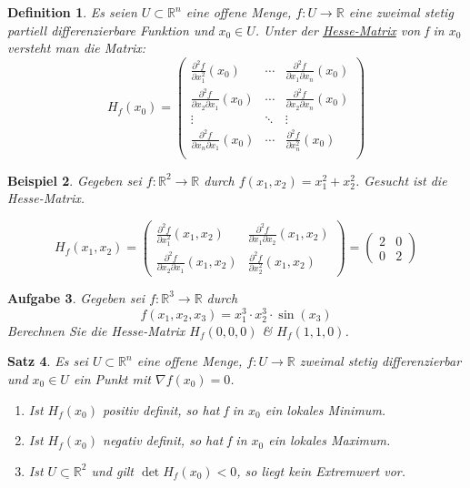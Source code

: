 \documentclass[fontset=ubuntu,12pt,a4paper]{scrreprt}
\newtheorem{defi}{Definition}[section]
\newtheorem{beispiel}[defi]{Beispiel}
\newtheorem{satz}[defi]{Satz}
\newtheorem{aufg}[defi]{Aufgabe}
\begin{document}
\begin{defi}
    Es seien \(U\subset\mathbb{R}^n\) eine offene Menge, \(f:U\to\mathbb{R}\) eine zweimal stetig partiell differenzierbare Funktion und \(x_0\in U\). Unter der \underline{Hesse-Matrix} von f in \(x_0\) versteht man die Matrix: \[H_f(x_0)=\begin{pmatrix}
    \frac{\partial^2 f}{\partial x_1^2}(x_0) & \cdots & \frac{\partial^2 f}{\partial x_1 \partial x_n}(x_0) \\
    \frac{\partial^2 f}{\partial x_2 \partial x_1}(x_0) & \cdots & \frac{\partial^2 f}{\partial x_2 \partial x_n}(x_0) \\
    \vdots & \ddots & \vdots \\
    \frac{\partial^2 f}{\partial x_n \partial x_1}(x_0) & \cdots & \frac{\partial^2 f}{\partial x_n^2}(x_0) \\
    \end{pmatrix}\]
\end{defi}

\begin{beispiel}
    Gegeben sei \(f:\mathbb{R}^2\to\mathbb{R}\) durch \(f(x_1,x_2)=x_1^2+x_2^2\). Gesucht ist die Hesse-Matrix.
    
    \[H_f(x_1,x_2)=\begin{pmatrix}
    \frac{\partial^2 f}{\partial x_1^2}(x_1,x_2)  & \frac{\partial^2 f}{\partial x_1 \partial x_2}(x_1,x_2) \\
    \frac{\partial^2 f}{\partial x_2 \partial x_1}(x_1,x_2) & \frac{\partial^2 f}{\partial x_2^2}(x_1,x_2)
    \end{pmatrix}=\begin{pmatrix}
    2 & 0 \\ 0 & 2
    \end{pmatrix}\]
\end{beispiel}

\begin{aufg}
    Gegeben sei \(f:\mathbb{R}^3\to\mathbb{R}\) durch
    \[f(x_1,x_2,x_3)=x_1^3 \cdot x_2^3 \cdot \sin(x_3)\]
    Berechnen Sie die Hesse-Matrix \(H_f(0,0,0)\) \& \(H_f(1,1,0)\).
\end{aufg}

\begin{satz}
    Es sei \(U\subset\mathbb{R}^n\) eine offene Menge, \(f:U\to\mathbb{R}\) zweimal stetig differenzierbar und \(x_0\in U\) ein Punkt mit \(\nabla f(x_0)=0\).
    \begin{enumerate}[label=\emph{(\roman*)}]
        \item Ist \(H_f(x_0)\) positiv definit, so hat f in \(x_0\) ein lokales Minimum.
        \item Ist \(H_f(x_0)\) negativ definit, so hat f in \(x_0\) ein lokales Maximum.
        \item Ist \(\underline{U\subset\mathbb{R}^2}\) und gilt \(\det H_f(x_0) < 0\), so liegt kein Extremwert vor.
    \end{enumerate}
\end{satz}
\end{document}

